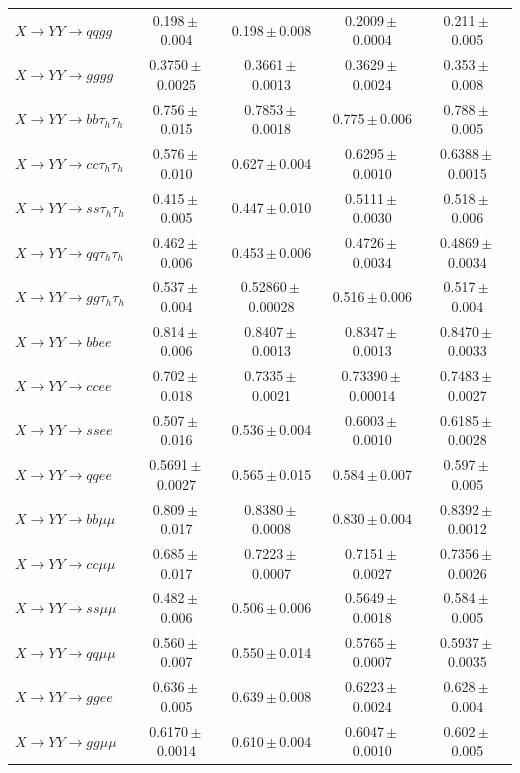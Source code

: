 \begin{landscape}
{\begin{longtable}{@{\extracolsep{\fill}}lcccc@{}}
$X\to YY\to qqgg$ & 0.198\,$\pm$\,0.004 & 0.198\,$\pm$\,0.008 & 0.2009\,$\pm$\,0.0004 & 0.211\,$\pm$\,0.005 \\
$X\to YY\to gggg$ & 0.3750\,$\pm$\,0.0025 & 0.3661\,$\pm$\,0.0013 & 0.3629\,$\pm$\,0.0024 & 0.353\,$\pm$\,0.008 \\
\midrule
$X\to YY\to bb\tau_h\tau_h$ & 0.756\,$\pm$\,0.015 & 0.7853\,$\pm$\,0.0018 & 0.775\,$\pm$\,0.006 & 0.788\,$\pm$\,0.005 \\
$X\to YY\to cc\tau_h\tau_h$ & 0.576\,$\pm$\,0.010 & 0.627\,$\pm$\,0.004 & 0.6295\,$\pm$\,0.0010 & 0.6388\,$\pm$\,0.0015 \\
$X\to YY\to ss\tau_h\tau_h$ & 0.415\,$\pm$\,0.005 & 0.447\,$\pm$\,0.010 & 0.5111\,$\pm$\,0.0030 & 0.518\,$\pm$\,0.006 \\
$X\to YY\to qq\tau_h\tau_h$ & 0.462\,$\pm$\,0.006 & 0.453\,$\pm$\,0.006 & 0.4726\,$\pm$\,0.0034 & 0.4869\,$\pm$\,0.0034 \\
$X\to YY\to gg\tau_h\tau_h$ & 0.537\,$\pm$\,0.004 & 0.52860\,$\pm$\,0.00028 & 0.516\,$\pm$\,0.006 & 0.517\,$\pm$\,0.004 \\
\midrule
$X\to YY\to bbee$ & 0.814\,$\pm$\,0.006 & 0.8407\,$\pm$\,0.0013 & 0.8347\,$\pm$\,0.0013 & 0.8470\,$\pm$\,0.0033 \\
$X\to YY\to ccee$ & 0.702\,$\pm$\,0.018 & 0.7335\,$\pm$\,0.0021 & 0.73390\,$\pm$\,0.00014 & 0.7483\,$\pm$\,0.0027 \\
$X\to YY\to ssee$ & 0.507\,$\pm$\,0.016 & 0.536\,$\pm$\,0.004 & 0.6003\,$\pm$\,0.0010 & 0.6185\,$\pm$\,0.0028 \\
$X\to YY\to qqee$ & 0.5691\,$\pm$\,0.0027 & 0.565\,$\pm$\,0.015 & 0.584\,$\pm$\,0.007 & 0.597\,$\pm$\,0.005 \\
$X\to YY\to bb\mu\mu$ & 0.809\,$\pm$\,0.017 & 0.8380\,$\pm$\,0.0008 & 0.830\,$\pm$\,0.004 & 0.8392\,$\pm$\,0.0012 \\
$X\to YY\to cc\mu\mu$ & 0.685\,$\pm$\,0.017 & 0.7223\,$\pm$\,0.0007 & 0.7151\,$\pm$\,0.0027 & 0.7356\,$\pm$\,0.0026 \\
$X\to YY\to ss\mu\mu$ & 0.482\,$\pm$\,0.006 & 0.506\,$\pm$\,0.006 & 0.5649\,$\pm$\,0.0018 & 0.584\,$\pm$\,0.005 \\
$X\to YY\to qq\mu\mu$ & 0.560\,$\pm$\,0.007 & 0.550\,$\pm$\,0.014 & 0.5765\,$\pm$\,0.0007 & 0.5937\,$\pm$\,0.0035 \\
$X\to YY\to ggee$ & 0.636\,$\pm$\,0.005 & 0.639\,$\pm$\,0.008 & 0.6223\,$\pm$\,0.0024 & 0.628\,$\pm$\,0.004 \\
$X\to YY\to gg\mu\mu$ & 0.6170\,$\pm$\,0.0014 & 0.610\,$\pm$\,0.004 & 0.6047\,$\pm$\,0.0010 & 0.602\,$\pm$\,0.005 \\

\end{longtable}}
\end{landscape}

